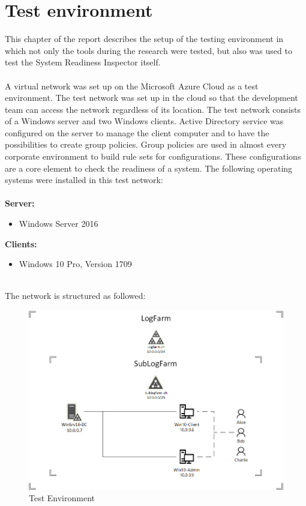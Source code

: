 \section{Test environment}\label{sec:testenvironment}
This chapter of the report describes the setup of the testing environment in which not only the tools during the research were tested, but also was used to test the System Readiness Inspector itself.
\\\\
A virtual network was set up on the Microsoft Azure Cloud as a test environment. The test network was set up in the cloud so that the development team can access the network regardless of its location. The test network consists of a Windows server and two Windows clients. Active Directory service was configured on the server to manage the client computer and to have the possibilities to create group policies. Group policies are used in almost every corporate environment to build rule sets for configurations. These configurations are a core element to check the readiness of a system. The following operating systems were installed in this test network: \\
\\
\textbf{Server:}
\begin{itemize}
    \item Windows Server 2016
\end{itemize}
\textbf{Clients:}
\begin{itemize}
    \item Windows 10 Pro, Version 1709
\end{itemize}
\ \\
The network is structured as followed:\\
\begin{figure}[H]
    \centering
    \includegraphics[width=0.9\linewidth]{assets/test-environment/testnetwork.png}
    \caption{Test Environment}
\end{figure}

